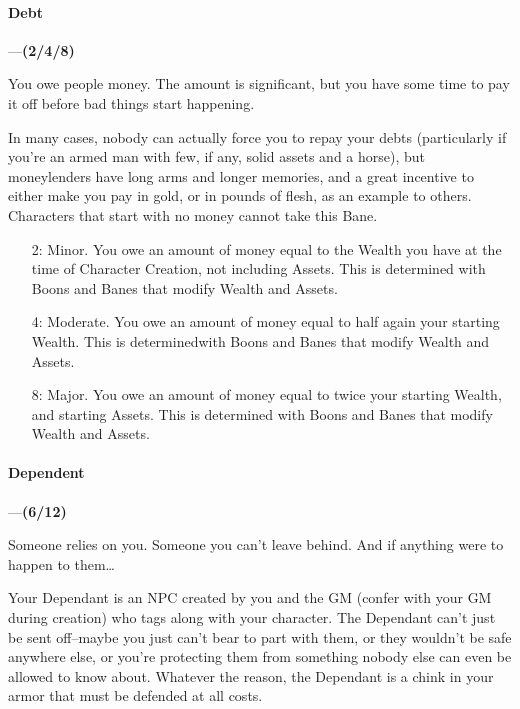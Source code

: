 \documentclass[oneside,11pt,english]{book}
\begin{document}
\paragraph{\label{bane:Debt}Debt}---\quad\textbf{(2/4/8) }\par
You owe people money. The amount is significant, but you have some time to pay it off before bad things 
start happening. 


In many cases, nobody can actually force you to repay your debts (particularly if you're an armed man 
with few, if any, solid assets and a horse), but moneylenders have long arms and longer memories, and a 
great incentive to either make you pay in gold, or in pounds of flesh, as an example to others. Characters 
that start with no money cannot take this Bane. 
\begin{itemize}
	\item [2:] Minor. You owe an amount of money equal to the Wealth you have at the time of Character Creation, not including Assets. This is determined with Boons and Banes that modify Wealth and Assets. 
	\item [4:] Moderate. You owe an amount of money equal to half again your starting Wealth. This is determinedwith Boons and Banes that modify Wealth and Assets. 
	\item [8:] Major. You owe an amount of money equal to twice your starting Wealth, and starting Assets. This is determined with Boons and Banes that modify Wealth and Assets.
\end{itemize}
\paragraph{\label{bane:Dependent}Dependent}---\quad\textbf{(6/12) }\par
Someone relies on you. Someone you can’t leave behind. And if anything were to happen to them… 


Your Dependant is an NPC created by you and the GM (confer with your GM during creation) who tags 
along with your character. The Dependant can’t just be sent off--maybe you just can’t bear to part with 
them, or they wouldn’t be safe anywhere else, or you’re protecting them from something nobody else can 
even be allowed to know about. Whatever the reason, the Dependant is a chink in your armor that must be 
defended at all costs. 
\end{document}
